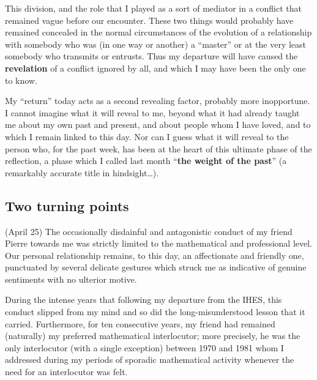 This division, and the role that I played as a sort of mediator 
in a conflict that remained vague before our encounter.
These two things would probably have remained concealed in the normal circumstances 
of the evolution of a relationship with somebody who was (in one way or another) a
``master'' or at the very least somebody who transmits or entrusts.
Thus my departure will have caused the \textbf{revelation} of a conflict ignored by all, and
which I may have been the only one to know.

My ``return'' today acts as a second revealing factor, probably more inopportune.
I cannot imagine what it will reveal to me, beyond what it had already taught me about my
own past and present, and about people whom I have loved, and to which I remain linked to
this day.
Nor can I guess what it will reveal to the person who, for the past week, has been at the
heart of this ultimate phase of the reflection, a phase which I called last month 
``\textbf{the weight of the past}''
(a remarkably accurate title in hindsight\ldots).

\subsection{Two turning points}

 (April 25) The occasionally disdainful and antagonistic conduct of my friend
Pierre towards me was strictly limited to the mathematical and professional level. 
Our personal relationship remains, to this day, an
affectionate and friendly one, punctuated by several delicate gestures which 
struck me as indicative of genuine sentiments with no ulterior motive. 

During the intense years that following my departure from the IHES, this conduct
slipped from my mind and so did the long-misunderstood lesson that it carried. 
Furthermore, for ten consecutive years, my friend had remained (naturally) my preferred
mathematical interlocutor; more precisely, he was the only interlocutor (with a single
exception) between 1970 and 1981 whom I addressed during my periods of sporadic
mathematical activity
 whenever the need for an interlocutor was felt. 

